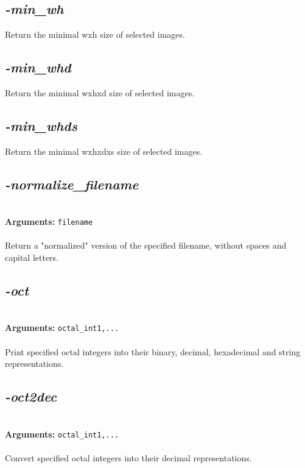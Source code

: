 \documentclass[a4paper,11pt,twoside]{book}
\begin{document}
\subsection{\emph{-min\_wh} }\vspace*{-0.5em}
Return the minimal wxh size of selected images.


\subsection{\emph{-min\_whd} }\vspace*{-0.5em}
Return the minimal wxhxd size of selected images.


\subsection{\emph{-min\_whds} }\vspace*{-0.5em}
Return the minimal wxhxdxs size of selected images.


\subsection{\emph{-normalize\_filename} }\vspace*{-0.5em}
~\\\textbf{Arguments: } 
{\small \texttt{filename}}\\~\\
Return a "normalized" version of the specified filename, without spaces and capital letters.


\subsection{\emph{-oct} }\vspace*{-0.5em}
~\\\textbf{Arguments: } 
{\small \texttt{octal\_int1,...}}\\~\\
Print specified octal integers into their binary, decimal, hexadecimal and string representations.


\subsection{\emph{-oct2dec} }\vspace*{-0.5em}
~\\\textbf{Arguments: } 
{\small \texttt{octal\_int1,...}}\\~\\
Convert specified octal integers into their decimal representations.
\end{document}

